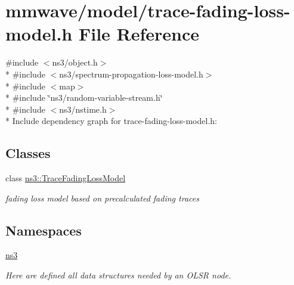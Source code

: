 \hypertarget{mmwave_2model_2trace-fading-loss-model_8h}{}\section{mmwave/model/trace-\/fading-\/loss-\/model.h File Reference}
\label{mmwave_2model_2trace-fading-loss-model_8h}
{\ttfamily \#include $<$ns3/object.\+h$>$}\\*
{\ttfamily \#include $<$ns3/spectrum-\/propagation-\/loss-\/model.\+h$>$}\\*
{\ttfamily \#include $<$map$>$}\\*
{\ttfamily \#include \char`\"{}ns3/random-\/variable-\/stream.\+h\char`\"{}}\\*
{\ttfamily \#include $<$ns3/nstime.\+h$>$}\\*
Include dependency graph for trace-\/fading-\/loss-\/model.h\+:
\subsection*{Classes}
\begin{DoxyCompactItemize}
\item 
class \hyperlink{classns3_1_1TraceFadingLossModel}{ns3\+::\+Trace\+Fading\+Loss\+Model}
\begin{DoxyCompactList}\small\item\em fading loss model based on precalculated fading traces \end{DoxyCompactList}\end{DoxyCompactItemize}
\subsection*{Namespaces}
\begin{DoxyCompactItemize}
\item 
 \hyperlink{namespacens3}{ns3}
\begin{DoxyCompactList}\small\item\em Here are defined all data structures needed by an O\+L\+SR node. \end{DoxyCompactList}\end{DoxyCompactItemize}
